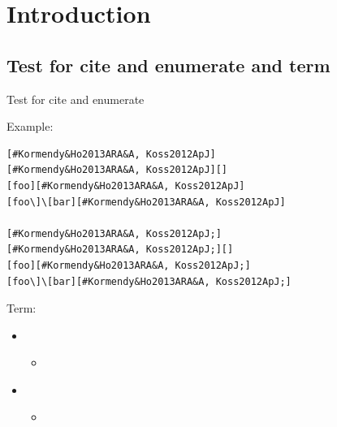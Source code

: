 











\section{Introduction}
\label{sec:intro}

\subsection{Test for cite and enumerate and term}
\label{sec:cite}

Test for cite and enumerate %





Example:

\begin{verbatim}
[#Kormendy&Ho2013ARA&A, Koss2012ApJ]
[#Kormendy&Ho2013ARA&A, Koss2012ApJ][]
[foo][#Kormendy&Ho2013ARA&A, Koss2012ApJ]
[foo\]\[bar][#Kormendy&Ho2013ARA&A, Koss2012ApJ]

[#Kormendy&Ho2013ARA&A, Koss2012ApJ;]
[#Kormendy&Ho2013ARA&A, Koss2012ApJ;][]
[foo][#Kormendy&Ho2013ARA&A, Koss2012ApJ;]
[foo\]\[bar][#Kormendy&Ho2013ARA&A, Koss2012ApJ;]
\end{verbatim}

Term:

\begin{itemize}
\item ~\citep{Kormendy&Ho2013ARA&A, Koss2012ApJ}

\begin{itemize}
\item ~\citep{Kormendy&Ho2013ARA&A, Koss2012ApJ}

\end{itemize}

\item ~\citep[foo]{Kormendy&Ho2013ARA&A, Koss2012ApJ}

\begin{itemize}
\item ~\citep[foo][bar]{Kormendy&Ho2013ARA&A, Koss2012ApJ}

\end{itemize}

\end{itemize}

